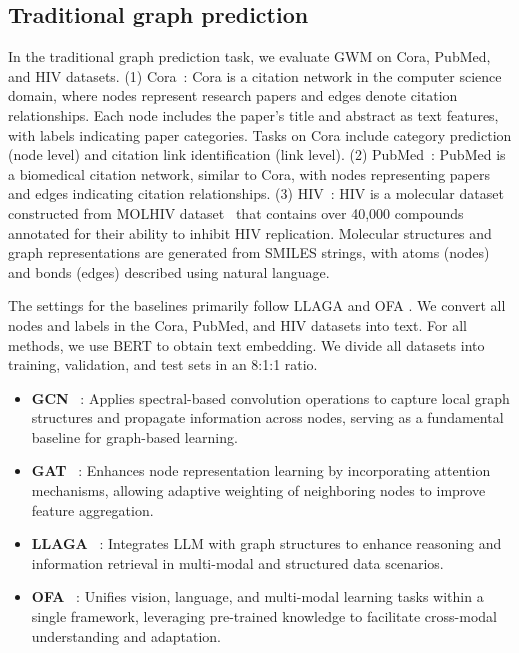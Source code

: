 \subsection{Traditional graph prediction} \label{apd:graph}
 In the traditional graph prediction task, we evaluate GWM on Cora, PubMed, and HIV datasets.
(1) Cora~\cite{chen2024exploring}: Cora is a citation network in the computer science domain, where nodes represent research papers and edges denote citation relationships. Each node includes the paper's title and abstract as text features, with labels indicating paper categories. Tasks on Cora include category prediction (node level) and citation link identification (link level).
(2) PubMed~\cite{chen2024exploring}: PubMed is a biomedical citation network, similar to Cora, with nodes representing papers and edges indicating citation relationships.
(3) HIV~\cite{liu2023one}: HIV is a molecular dataset constructed from MOLHIV dataset~\cite{wu2018moleculenet} that contains over 40,000 compounds annotated for their ability to inhibit HIV replication. Molecular structures and graph representations are generated from SMILES strings, with atoms (nodes) and bonds (edges) described using natural language.

 The settings for the baselines primarily follow LLAGA \citep{chen2024llaga} and OFA \citep{liu2023one}. We convert all nodes and labels in the Cora, PubMed, and HIV datasets into text. For all methods, we use BERT to obtain text embedding. We divide all datasets into training, validation, and test sets in an 8:1:1 ratio. 

 \begin{itemize}[leftmargin=1em, itemsep=0pt] 
 \item \textbf{GCN} ~\cite{Thomas2017GCN}: Applies spectral-based convolution operations to capture local graph structures and propagate information across nodes, serving as a fundamental baseline for graph-based learning.
\item  \textbf{GAT} ~\cite{velivckovic2017gat}: Enhances node representation learning by incorporating attention mechanisms, allowing adaptive weighting of neighboring nodes to improve feature aggregation.
\item \textbf{LLAGA} ~\cite{chen2024llaga}: Integrates LLM with graph structures to enhance reasoning and information retrieval in multi-modal and structured data scenarios.
\item \textbf{OFA} ~\cite{liu2023one}: Unifies vision, language, and multi-modal learning tasks within a single framework, leveraging pre-trained knowledge to facilitate cross-modal understanding and adaptation.
 \end{itemize} 

